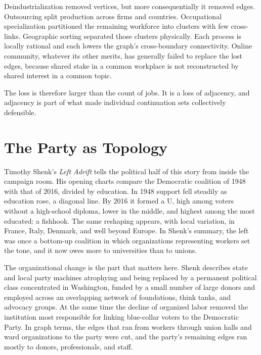 \documentclass[11pt]{article}
\begin{document}
Deindustrialization removed vertices, but more consequentially it removed edges. Outsourcing split production across firms and countries. Occupational specialization partitioned the remaining workforce into clusters with few cross-links. Geographic sorting separated those clusters physically. Each process is locally rational and each lowers the graph's cross-boundary connectivity. Online community, whatever its other merits, has generally failed to replace the lost edges, because shared stake in a common workplace is not reconstructed by shared interest in a common topic.

The loss is therefore larger than the count of jobs. It is a loss of adjacency, and adjacency is part of what made individual continuation sets collectively defensible.

\section{The Party as Topology}

Timothy Shenk's \emph{Left Adrift} tells the political half of this story from inside the campaign room. His opening charts compare the Democratic coalition of 1948 with that of 2016, divided by education. In 1948 support fell steadily as education rose, a diagonal line. By 2016 it formed a U, high among voters without a high-school diploma, lower in the middle, and highest among the most educated: a fishhook. The same reshaping appears, with local variation, in France, Italy, Denmark, and well beyond Europe. In Shenk's summary, the left was once a bottom-up coalition in which organizations representing workers set the tone, and it now owes more to universities than to unions.

The organizational change is the part that matters here. Shenk describes state and local party machines atrophying and being replaced by a permanent political class concentrated in Washington, funded by a small number of large donors and employed across an overlapping network of foundations, think tanks, and advocacy groups. At the same time the decline of organized labor removed the institution most responsible for linking blue-collar voters to the Democratic Party. In graph terms, the edges that ran from workers through union halls and ward organizations to the party were cut, and the party's remaining edges ran mostly to donors, professionals, and staff.
\end{document}
